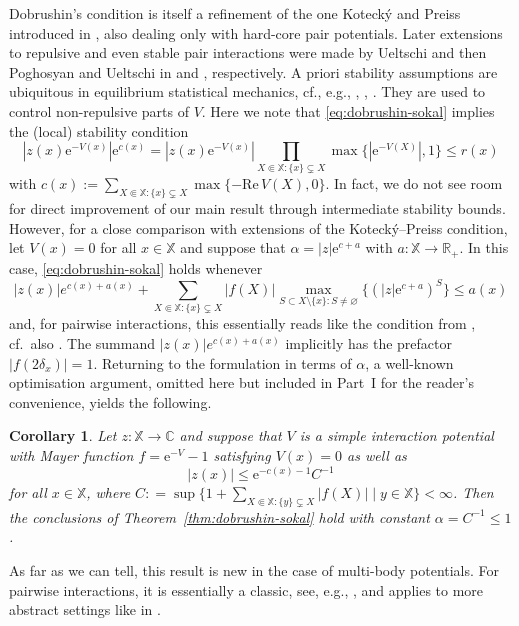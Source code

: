 \documentclass[reqno, 11pt]{amsart}
\newtheorem{cor}[theorem]{Corollary}
\theoremstyle{definition}
\newcommand{\e}{\mathrm{e}}
\newcommand{\R}{\mathbb{R}}
\newcommand{\C}{\mathbb{C}}
\newcommand{\X}{\mathbb X}
\renewcommand{\Re}{\mathrm{Re}\,}
\begin{document}
Dobrushin's condition is itself a refinement of the one Koteck{\'y} and Preiss introduced in \cite{ref:kotecky-preiss}, also dealing only with hard-core pair potentials. 
Later extensions to repulsive and even stable pair interactions were made by Ueltschi and then Poghosyan and Ueltschi in \cite{ref:ueltschi} and \cite{ref:poghosyan-ueltschi}, respectively. 
A priori stability assumptions are ubiquitous in equilibrium statistical mechanics, cf., e.g., \cite{ref:ruelle}, \cite{ref:gallavotti-miracle-sole, ref:gallavotti-miracle-sole-robinson}, \cite{ref:poghosyan-ueltschi, ref:procacci-yuhjtman, ref:jansen-cluster, ref:jansen-kolesnikov}. 
They are used to control non-repulsive parts of $V$. 
Here we note that \eqref{eq:dobrushin-sokal} implies the (local) stability condition
\[
	|z(x) \e^{-V(x)}| \e^{c(x)} = |z(x) \e^{-V(x)}| \prod_{X \Subset \X : \{x\} \subsetneq X} \max\{|\e^{-V(X)}|, 1\} \leq r(x)
\]
with $c(x) := \sum_{X \Subset \X : \{x\} \subsetneq X} \max\{-\Re V(X), 0\}$. 
In fact, we do not see room for direct improvement of our main result through intermediate stability bounds. 
However, for a close comparison with extensions of the Koteck{\'y}--Preiss condition, let $V(x) = 0$ for all $x \in \X$ and suppose that $\alpha = |z| \e^{c + a}$ with $a : \X\to\R_+$. 
In this case, \eqref{eq:dobrushin-sokal} holds whenever
\[
	|z(x)| e^{c(x) + a(x)} + \sum_{X \Subset \X : \{x\} \subsetneq X} |f(X)| \max_{S \subset X \setminus \{x\} : S \neq \varnothing}\{ (|z| \e^{c + a})^S\} \leq a(x)
\]
and, for pairwise interactions, this essentially reads like the condition from \cite{ref:poghosyan-ueltschi}, cf.\ also \cite{ref:jansen-kolesnikov}. 
The summand $|z(x)| e^{c(x)+a(x)}$ implicitly has the prefactor $|f(2\delta_x)| = 1$. 
Returning to the formulation in terms of $\alpha$, a well-known optimisation argument, omitted here but included in Part~I for the reader's convenience, yields the following.

\begin{cor}
	Let $z : \X \to \C$ and suppose that $V$ is a simple interaction potential with Mayer function $f = \e^{-V} - 1$ satisfying $V(x)=0$ as well as
	\[
		|z(x)| \leq \e^{-c(x)-1} C^{-1}
	\]
	for all $x \in \X$, where $C : = \sup\{1 + \sum_{X \Subset \X : \{y\} \subsetneq X} |f(X)| \mid y \in \X\} < \infty$. Then the conclusions of Theorem~\ref{thm:dobrushin-sokal} hold with constant $\alpha = C^{-1} \leq 1$.
\end{cor}

As far as we can tell, this result is new in the case of multi-body potentials. 
For pairwise interactions, it is essentially a classic, see, e.g., \cite{ref:ruelle}, and applies to more abstract settings like in \cite{ref:poghosyan-ueltschi, ref:jansen-kolesnikov}.
\end{document}
